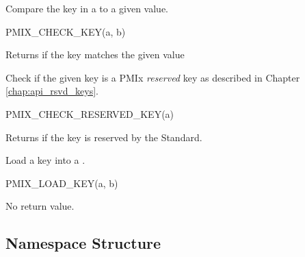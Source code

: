 
Compare the key in a  to a given value.

\cspecificstart
\begin{codepar}
PMIX_CHECK_KEY(a, b)
\end{codepar}
\cspecificend

\begin{arglist}
\end{arglist}

Returns  if the key matches the given value


Check if the given key is a \ac{PMIx} \emph{reserved} key as described in Chapter \ref{chap:api_rsvd_keys}.

\cspecificstart
\begin{codepar}
PMIX_CHECK_RESERVED_KEY(a)
\end{codepar}
\cspecificend

\begin{arglist}
\end{arglist}

Returns  if the key is reserved by the Standard.


Load a key into a .

\cspecificstart
\begin{codepar}
PMIX_LOAD_KEY(a, b)
\end{codepar}
\cspecificend

\begin{arglist}
\end{arglist}

No return value.

\subsection{Namespace Structure}

